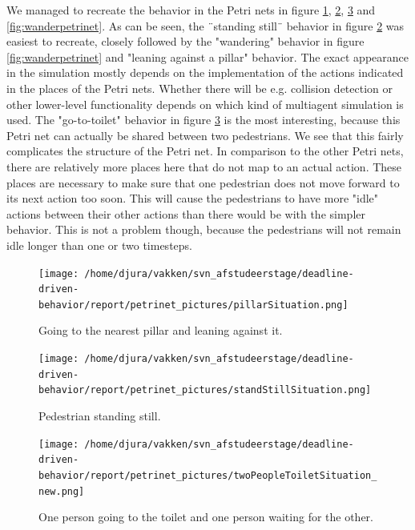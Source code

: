 \documentclass[11pt, a4paper]{book}
\begin{document}
We managed to recreate the behavior in the Petri nets in figure \ref{fig:pillarpetrinet}, \ref{fig:standstillpetrinet}, \ref{fig:gototoiletpetrinet} and \ref{fig:wanderpetrinet}. As can be seen, the ¨standing still¨ behavior in figure \ref{fig:standstillpetrinet} was easiest to recreate, closely followed by the "wandering" behavior in figure \ref{fig:wanderpetrinet} and "leaning against a pillar" behavior. The exact appearance in the simulation mostly depends on the implementation of the actions indicated in the places of the Petri nets. Whether there will be e.g. collision detection or other lower-level functionality depends on which kind of multiagent simulation is used. The "go-to-toilet" behavior in figure \ref{fig:gototoiletpetrinet} is the most interesting, because this Petri net can actually be shared between two pedestrians. We see that this fairly complicates the structure of the Petri net. In comparison to the other Petri nets, there are relatively more places here that do not map to an actual action. These places are necessary to make sure that one pedestrian does not move forward to its next action too soon. This will cause the pedestrians to have more "idle" actions between their other actions than there would be with the simpler behavior. This is not a problem though, because the pedestrians will not remain idle longer than one or two timesteps.


\begin{figure}[[h!]
\centering            
\texttt{[image: /home/djura/vakken/svn\_afstudeerstage/deadline-driven-behavior/report/petrinet\_pictures/pillarSituation.png]}
\caption{Going to the nearest pillar and leaning against it.}
\label{fig:pillarpetrinet}
\end{figure}

\begin{figure}[h!]
\centering            
\texttt{[image: /home/djura/vakken/svn\_afstudeerstage/deadline-driven-behavior/report/petrinet\_pictures/standStillSituation.png]}
\caption{Pedestrian standing still.}
\label{fig:standstillpetrinet}
\end{figure}

\begin{figure}[h!]
\centering            
\texttt{[image: /home/djura/vakken/svn\_afstudeerstage/deadline-driven-behavior/report/petrinet\_pictures/twoPeopleToiletSituation\_new.png]}
\caption{One person going to the toilet and one person waiting for the other.}
\label{fig:gototoiletpetrinet}
\end{figure}
\end{document}
